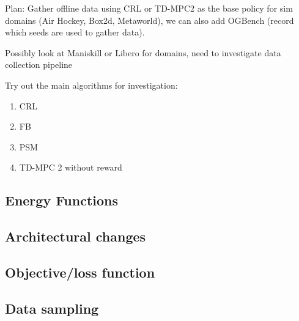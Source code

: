 Plan: 
Gather offline data using CRL or TD-MPC2 as the base policy for sim domains (Air Hockey, Box2d, Metaworld), we can also add OGBench (record which seeds are used to gather data).

Possibly look at Maniskill or Libero for domains, need to investigate data collection pipeline

Try out the main algorithms for investigation:
\begin{enumerate}
    \item CRL
    \item FB
    \item PSM
    \item TD-MPC 2 without reward
\end{enumerate}

\subsection{Energy Functions}
\subsection{Architectural changes}
\subsection{Objective/loss function}
\subsection{Data sampling}